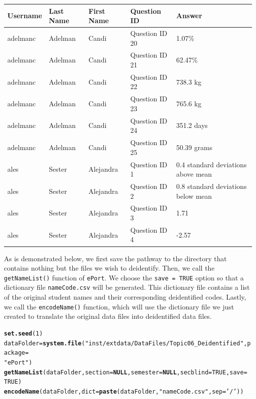 \documentclass{article}\usepackage[]{graphicx}\usepackage[]{color}
\makeatletter
\newcommand{\hlnum}[1]{\textcolor[rgb]{0.686,0.059,0.569}{#1}}%
\newcommand{\hlstr}[1]{\textcolor[rgb]{0.192,0.494,0.8}{#1}}%
\newcommand{\hlstd}[1]{\textcolor[rgb]{0.345,0.345,0.345}{#1}}%
\newcommand{\hlkwa}[1]{\textcolor[rgb]{0.161,0.373,0.58}{\textbf{#1}}}%
\newcommand{\hlkwb}[1]{\textcolor[rgb]{0.69,0.353,0.396}{#1}}%
\newcommand{\hlkwc}[1]{\textcolor[rgb]{0.333,0.667,0.333}{#1}}%
\newcommand{\hlkwd}[1]{\textcolor[rgb]{0.737,0.353,0.396}{\textbf{#1}}}%
\newenvironment{kframe}{%
 \def\at@end@of@kframe{}%
 \ifinner\ifhmode%
  \def\at@end@of@kframe{\end{minipage}}%
  \begin{minipage}{\columnwidth}%
 \fi\fi%
 \def\FrameCommand##1{\hskip\@totalleftmargin \hskip-\fboxsep
 \colorbox{shadecolor}{##1}\hskip-\fboxsep
     \hskip-\linewidth \hskip-\@totalleftmargin \hskip\columnwidth}%
 \MakeFramed {\advance\hsize-\width
   \@totalleftmargin\z@ \linewidth\hsize
   \@setminipage}}%
 {\par\unskip\endMakeFramed%
 \at@end@of@kframe}
\newenvironment{knitrout}{}{} %
\numberwithin{equation}{section} %
\makeatother
\begin{document}
\begin{center}
\label{tab:beforeDeidentify}
\begin{tabular} { | l | l | l | l | l |}
\hline \textbf{Username} & \textbf{Last Name} & \textbf{First Name} & \textbf{Question ID} & \textbf{Answer} \\
\hline
adelmanc & Adelman & Candi & Question ID 20 & 1.07\% \\
\hline
adelmanc & Adelman & Candi & Question ID 21 & 62.47\% \\
\hline
adelmanc & Adelman & Candi & Question ID 22 & 738.3 kg \\
\hline
adelmanc & Adelman & Candi & Question ID 23 & 765.6 kg\\
\hline
adelmanc & Adelman & Candi & Question ID 24 & 351.2 days \\
\hline
adelmanc & Adelman & Candi & Question ID 25 & 50.39 grams \\
\hline
ales & Sester & Alejandra & Question ID 1 & 0.4 standard deviations above mean \\
\hline
ales & Sester & Alejandra & Question ID 2 & 0.8 standard deviations below mean \\
\hline
ales & Sester & Alejandra & Question ID 3 & 1.71 \\
\hline
ales & Sester & Alejandra & Question ID 4 & -2.57 \\
\hline
\end{tabular}
\end{center}

As is demonstrated below, we first save the pathway to the directory that contains nothing but the files we wish to deidentify. Then, we call the \texttt{getNameList()} function of \texttt{ePort}. We choose the \texttt{save = TRUE} option so that a dictionary file \texttt{nameCode.csv} will be generated. This dictionary file contains a list of the original student names and their corresponding deidentified codes. Lastly, we call the \texttt{encodeName()} function, which will use the dictionary file we just created to translate the original data files into deidentified data files. \\

\begin{knitrout}
\color{fgcolor}\begin{kframe}
\begin{alltt}
\hlkwd{set.seed}\hlstd{(}\hlnum{1}\hlstd{)}
\hlstd{dataFolder} \hlkwb{=} \hlkwd{system.file}\hlstd{(}\hlstr{"inst/extdata/DataFiles/Topic06_Deidentified"}\hlstd{,} \hlkwc{package} \hlstd{=}
  \hlstr{"ePort"}\hlstd{)}
\hlkwd{getNameList}\hlstd{(dataFolder,} \hlkwc{section} \hlstd{=} \hlkwa{NULL}\hlstd{,} \hlkwc{semester} \hlstd{=} \hlkwa{NULL}\hlstd{,} \hlkwc{secblind} \hlstd{=} \hlnum{TRUE}\hlstd{,} \hlkwc{save} \hlstd{=}
  \hlnum{TRUE}\hlstd{)}
\hlkwd{encodeName}\hlstd{(dataFolder,} \hlkwc{dict} \hlstd{=} \hlkwd{paste}\hlstd{(dataFolder,} \hlstr{"nameCode.csv"}\hlstd{,} \hlkwc{sep} \hlstd{=} \hlstr{'/'}\hlstd{))}
\end{alltt}
\end{kframe}
\end{knitrout}
\end{document}
